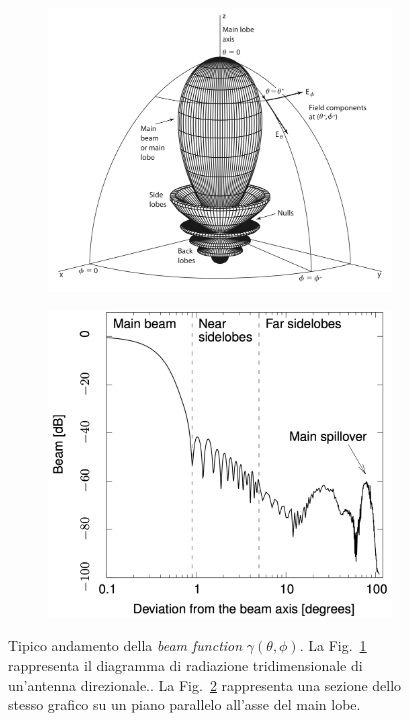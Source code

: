 \documentclass[12pt,a4paper,final]{book}
\begin{document}
\begin{figure}[!ht]
\centering
	\begin{subfigure}{0.5\textwidth}
	    \centering
	    \includegraphics[width=\linewidth]{../figures/diag_rad}
	    \caption{}
	    \label{beam}
	\end{subfigure}
	\begin{subfigure}{0.45\textwidth}
		\centering
	    \includegraphics[width=\linewidth]{../figures/risposta_ottica.png}
		\caption{}
		\label{beam_cut}
	\end{subfigure}
\caption{Tipico andamento della \textit{beam function} $\gamma(\theta,\phi)$. La Fig.~\ref{beam} rappresenta il diagramma di radiazione tridimensionale di un'antenna direzionale.\cite{cmb}. La Fig.~\ref{beam_cut} rappresenta una sezione dello stesso grafico su un piano parallelo all'asse del main lobe.\cite{planck}}
\label{diag_rad}
\end{figure}
\end{document}
